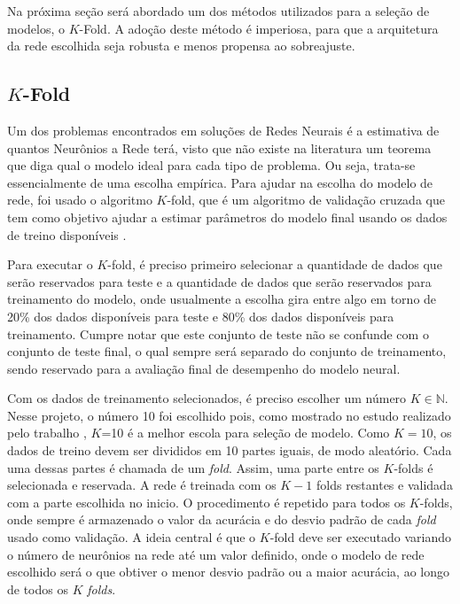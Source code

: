 Na próxima seção será abordado um dos métodos utilizados para a seleção de modelos, o $K$-Fold. A adoção deste método é imperiosa, para que a arquitetura da rede escolhida seja robusta e menos propensa ao sobreajuste.

\subsection{$K$-Fold}
 
 Um dos problemas encontrados em soluções de Redes Neurais é a estimativa de quantos Neurônios a Rede terá, visto que não existe na literatura um teorema que diga qual o modelo ideal para cada tipo de problema. Ou seja, trata-se essencialmente de uma escolha empírica. Para ajudar na escolha do modelo de rede, foi usado o algoritmo $K$-fold, que é um algoritmo de validação cruzada que tem como objetivo ajudar a estimar parâmetros do modelo final usando os dados de treino disponíveis \cite{bengio2004no}.
 
  Para executar o $K$-fold, é preciso primeiro selecionar a quantidade de dados que serão reservados para teste e a quantidade de dados que serão reservados para treinamento do modelo, onde usualmente a escolha gira entre algo em torno de 20\% dos dados disponíveis para teste e 80\% dos dados disponíveis para treinamento. Cumpre notar que este conjunto de teste não se confunde com o conjunto de teste final, o qual sempre será separado do conjunto de treinamento, sendo reservado para a avaliação final de desempenho do modelo neural.
  
  Com os dados de treinamento selecionados, é preciso escolher um número $K \in \mathbb{N}$. Nesse projeto, o número 10 foi escolhido pois, como mostrado no estudo realizado pelo trabalho \cite{kohavi1995study}, $K$=10 é a melhor escola para seleção de modelo. Como $K=10$, os dados de treino devem ser divididos em 10 partes iguais, de modo aleatório. Cada uma dessas partes é chamada de um \textit{fold}. Assim, uma parte entre os $K$-folds é selecionada e reservada. A rede é treinada com os $K-1$ folds restantes e validada com a parte escolhida no inicio. O procedimento é repetido para todos os $K$-folds, onde sempre é armazenado o valor da acurácia e do desvio padrão de cada \textit{fold} usado como validação. A ideia central é que o $K$-fold deve ser executado variando o número de neurônios na rede até um valor definido, onde o modelo de rede escolhido será o que obtiver o menor desvio padrão ou a maior acurácia, ao longo de todos os $K$ \textit{folds}.
  
